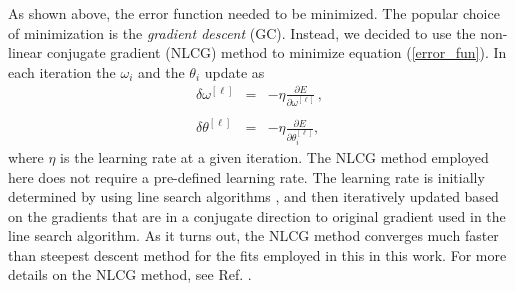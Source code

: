 %
As shown above, the error function needed to be minimized. The popular choice of minimization is the \textit{gradient descent} (GC). Instead, 
we decided to use the non-linear conjugate gradient (NLCG) method \cite{Nocedal:2000sp, CGmethod} to minimize equation (\ref{error_fun}). 
In each iteration the $\omega_i$ and the $\theta_i$ update as \cite{Grant:2019yar}
%
\begin{eqnarray}\label{steepest_descent}
\delta\omega^{[\ell]} &=& -\eta\frac{\partial
E}{\partial\omega^{[\ell]}}\,, \nonumber \\ \\ \nonumber
\delta\theta^{[\ell]} &=& - \eta\frac{\partial
E}{\partial\theta_{i}^{[\ell]}},
\end{eqnarray} 
%
%
where $\eta$ is the learning rate at a given iteration. The NLCG method employed here does not require a pre-defined learning rate. 
The learning rate is initially determined by using line search algorithms \cite{Nocedal:2000sp}, and then iteratively updated based on the gradients that are in a conjugate direction to original gradient used in the line search algorithm. As it turns out, the NLCG method converges much faster than steepest descent method for the fits employed in this in this work. For more details on the NLCG method, see Ref. \cite{CGmethod}. 


